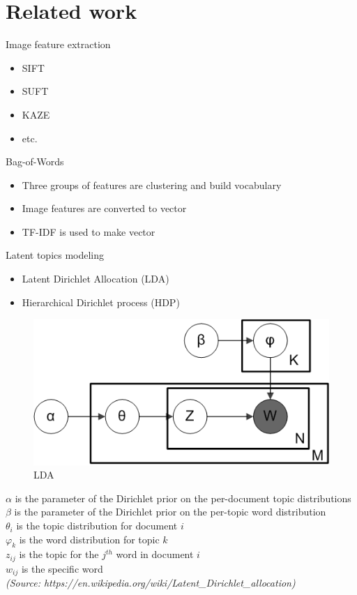 \documentclass{beamer}
\begin{document}
\section{Related work}
\begin{frame}{Image feature extraction}
    \begin{itemize}
        \item<1-> SIFT
        \item<2-> SUFT
        \item<3-> KAZE
        \item<4-> etc.
    \end{itemize}
\end{frame}

\begin{frame}{Bag-of-Words}
    \begin{itemize}
        \item Three groups of features are clustering and build vocabulary
        \item Image features are converted to vector
        \item TF-IDF is used to make vector
    \end{itemize}
\end{frame}

\begin{frame}{Latent topics modeling}
    \begin{itemize}
        \item<1-> Latent Dirichlet Allocation (LDA)
        \item<2-> Hierarchical Dirichlet process (HDP)
    \end{itemize}
    
    \begin{figure}
        \includegraphics[width=.5\textwidth]{Latent_Dirichlet_allocation-1.png}
        \caption{LDA} \label{fig:LDA}
    \end{figure}
    
    {\tiny
    $\alpha$ is the parameter of the Dirichlet prior on the per-document topic distributions \\
    $\beta$ is the parameter of the Dirichlet prior on the per-topic word distribution \\
$\theta _{i}$ is the topic distribution for document $i$ \\
$\varphi _{k}$ is the word distribution for topic $k$ \\
$z_{ij}$ is the topic for the $j^{th}$ word in document $i$ \\
$w_{ij}$ is the specific word \\
}
    \vspace{0.5cm}
    \textit{\tiny (Source: https://en.wikipedia.org/wiki/Latent\_Dirichlet\_allocation)}
\end{frame}
\end{document}
